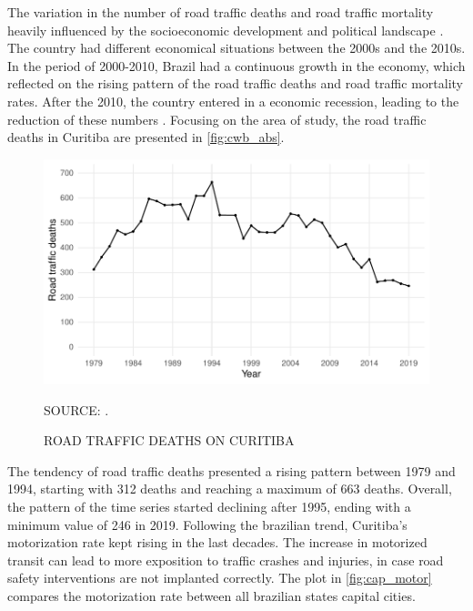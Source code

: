 

The variation in the number of road traffic deaths and road traffic mortality heavily influenced by the socioeconomic development and political landscape \cite{Ferraz2012}. The country had different economical situations between the 2000s and the 2010s. In the period of 2000-2010, Brazil had a continuous growth in the economy, which reflected on the rising pattern of the road traffic deaths and road traffic mortality rates. After the 2010, the country entered in a economic recession, leading to the reduction of these numbers \cite{Bastos2020}. Focusing on the area of study, the road traffic deaths in Curitiba are presented in \autoref{fig:cwb_abs}.   



\begin{figure}[!htbp]
    \centering\footnotesize
    \captionsetup{font=footnotesize}
    \caption{ROAD TRAFFIC DEATHS ON CURITIBA}
    \includegraphics{fig/cwb_abs.pdf}
    \label{fig:cwb_abs}
    \par SOURCE: \textcite{MinistryofHealth2020}.
\end{figure}  

The tendency of road traffic deaths presented a rising pattern between 1979 and 1994, starting with 312 deaths and reaching a maximum of 663 deaths. Overall, the pattern of the time series started declining after 1995, ending with a minimum value of 246 in 2019. Following the brazilian trend, Curitiba's motorization rate kept rising in the last decades. The increase in motorized transit can lead to more exposition to traffic crashes and injuries, in case road safety interventions are not implanted correctly. The plot in \autoref{fig:cap_motor} compares the motorization rate between all brazilian states capital cities.    

